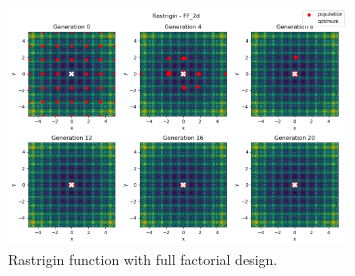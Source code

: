 \begin{figure}[H]
    \centering
    \includegraphics[width=0.8\textwidth]{lab9/imgs/doe_rastrigin.png}
    \caption{Rastrigin function with full factorial design.}
    \label{fig:doe-rastrigin}
\end{figure}